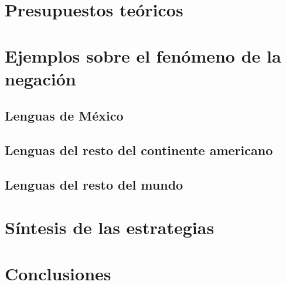 \documentclass[12pt,letterpaper]{report}
\begin{document}

\tableofcontents



\part{Presupuestos teóricos}


\part{Ejemplos sobre el fenómeno de la negación}
\chapter{Lenguas de México}


























\chapter{Lenguas del resto del continente americano}




















\chapter{Lenguas del resto del mundo}















\part{Síntesis de las estrategias}




\part{Conclusiones}


\end{document}
